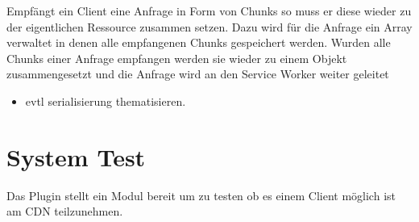 Empfängt ein Client eine Anfrage in Form von Chunks so muss er diese wieder zu der eigentlichen Ressource zusammen setzen. Dazu wird für die Anfrage ein Array verwaltet in denen alle empfangenen Chunks gespeichert werden. Wurden alle Chunks einer Anfrage empfangen werden sie wieder zu einem Objekt zusammengesetzt und die Anfrage wird an den Service Worker weiter geleitet

\begin{itemize}
	\item evtl serialisierung thematisieren.
\end{itemize}



\section{System Test}
Das Plugin stellt ein Modul bereit um zu testen ob es einem Client möglich ist am \pTp CDN teilzunehmen.


